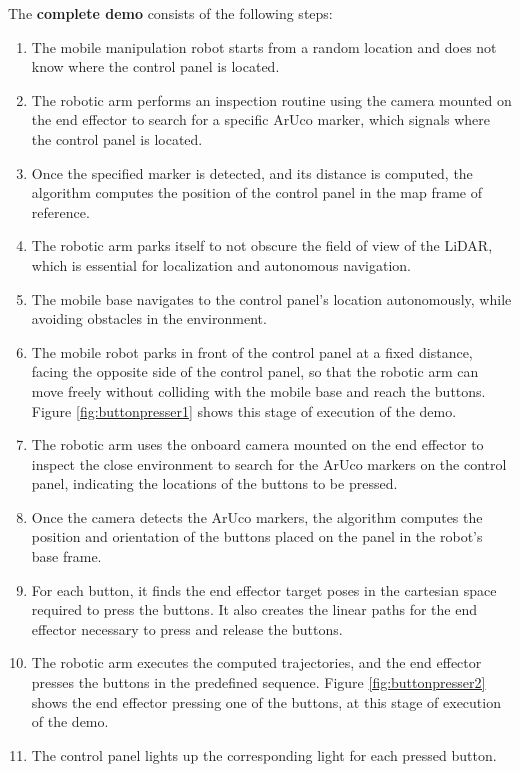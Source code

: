 The \textbf{complete demo} consists of the following steps:
\begin{enumerate}
    \item The mobile manipulation robot starts from a random location and does not know 
    where the control panel is located.
    \item The robotic arm performs an inspection routine using the camera mounted on the end effector
    to search for a specific ArUco marker, which signals where the control panel is located.
    \item Once the specified marker is detected, and its distance is computed, the algorithm computes the
    position of the control panel in the map frame of reference.
    \item The robotic arm parks itself to not obscure the field of view of the LiDAR, which is essential for 
    localization and autonomous navigation.
    \item The mobile base navigates to the control panel's location autonomously, while avoiding obstacles in the
    environment.
    \item The mobile robot parks in front of the control panel at a fixed distance, facing the opposite side of the control panel,
    so that the robotic arm can move freely without colliding with the mobile base and reach the buttons.
    Figure \ref{fig:buttonpresser1} shows this stage of execution of the demo.
    \item The robotic arm uses the onboard camera mounted on the end effector to inspect the close environment
    to search for the ArUco markers on the control panel, indicating the locations of the buttons to be pressed.
    \item Once the camera detects the ArUco markers, the algorithm computes the position and orientation
    of the buttons placed on the panel in the robot's base frame.
    \item For each button, it finds the end effector target poses in the cartesian space required to press the buttons.
    It also creates the linear paths for the end effector necessary to press and release the buttons.
    \item The robotic arm executes the computed trajectories, and the end effector presses the buttons in the predefined sequence.
    Figure \ref{fig:buttonpresser2} shows the end effector pressing one of the buttons, at this stage of execution of the demo.
    \item The control panel lights up the corresponding light for each pressed button.
\end{enumerate}


